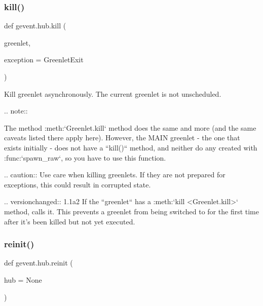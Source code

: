 \subsubsection{\texorpdfstring{kill()}{kill()}}
{\footnotesize\ttfamily def gevent.\+hub.\+kill (\begin{DoxyParamCaption}\item[{}]{greenlet,  }\item[{}]{exception = {\ttfamily GreenletExit} }\end{DoxyParamCaption})}

\begin{DoxyVerb}Kill greenlet asynchronously. The current greenlet is not unscheduled.

.. note::

    The method :meth:`Greenlet.kill` method does the same and
    more (and the same caveats listed there apply here). However, the MAIN
    greenlet - the one that exists initially - does not have a
    ``kill()`` method, and neither do any created with :func:`spawn_raw`,
    so you have to use this function.

.. caution:: Use care when killing greenlets. If they are not prepared for
   exceptions, this could result in corrupted state.

.. versionchanged:: 1.1a2
    If the ``greenlet`` has a :meth:`kill <Greenlet.kill>` method, calls it. This prevents a
    greenlet from being switched to for the first time after it's been
    killed but not yet executed.
\end{DoxyVerb}
 \mbox{\label{namespacegevent_1_1hub_a98badd351609faa2bd11b1ea5ee42e3c}} 
\subsubsection{\texorpdfstring{reinit()}{reinit()}}
{\footnotesize\ttfamily def gevent.\+hub.\+reinit (\begin{DoxyParamCaption}\item[{}]{hub = {\ttfamily None} }\end{DoxyParamCaption})}

